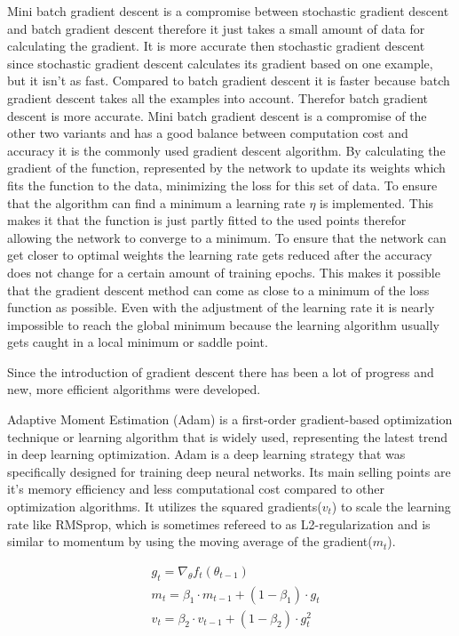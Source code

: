 \documentclass[
a4paper, 
12pt,
grayscalebody, %
abstract=on,
twoside, BCOR10mm, 12pt, DIV13,headinclude, footexclude, final, abstracton, openright
]{ibireprt}
\numberwithin{equation}{chapter}
\numberwithin{table}{chapter}
\numberwithin{figure}{chapter}
\numberwithin{algorithm}{chapter}
\numberwithin{example}{chapter}
\numberwithin{example}{chapter}
\begin{document}
 
Mini batch gradient descent is a compromise between stochastic gradient descent and batch gradient descent therefore it just takes a small amount of data for calculating the gradient. It is more accurate then stochastic gradient descent since stochastic gradient descent calculates its gradient based on one example, but it isn't as fast. Compared to batch gradient descent it is faster because batch gradient descent takes all the examples into account. Therefor batch gradient descent is more accurate. Mini batch gradient descent is a compromise of the other two variants and has a good balance between computation cost and accuracy it is the commonly used gradient descent algorithm. By calculating the gradient of the function, represented by the network to update its weights which fits the function to the data, minimizing the loss for this set of data. To ensure that the algorithm can find a minimum a learning rate $\eta$ is implemented. This makes it that the function is just partly fitted to the used points therefor allowing the network to converge to a minimum. To ensure that the network can get closer to optimal weights the learning rate gets reduced after the accuracy does not change for a certain amount of training epochs.
This makes it possible that the gradient descent method can come as close to a minimum of the loss function as possible. Even with the adjustment of the learning rate it is nearly impossible to reach the global minimum because the learning algorithm usually gets caught in a local minimum or saddle point.


Since the introduction of gradient descent there has been a lot of progress and new, more efficient algorithms were developed. 

Adaptive Moment Estimation (Adam) \cite{Kingma2014} is a first-order gradient-based optimization technique or learning algorithm that is widely used, representing the latest trend in deep learning optimization. Adam is a deep learning strategy that was specifically designed for training deep neural networks. Its main selling points are it's memory efficiency and less computational cost compared to other optimization algorithms. 
It  utilizes the squared gradients($v_t$) to scale the learning rate like RMSprop, which is sometimes refereed to as L2-regularization and is similar to momentum by using the moving average of the gradient($m_t$).


\begin{align}
	& g_t = \nabla_\theta f_t(\theta_{t-1})\\
	& m_t =\beta_1\cdot m_{t-1} + (1- \beta_1)\cdot g_t \\
	& v_t =\beta_2\cdot v_{t-1} + (1- \beta_2)\cdot g_t^2
\end{align}
\end{document}
